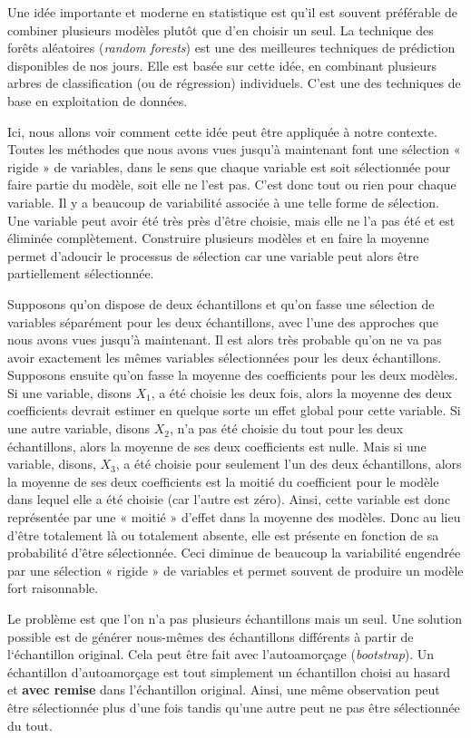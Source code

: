 \documentclass[
  11pt,
  letterpaper,
]{book}
\theoremstyle{definition}
\theoremstyle{definition}
\theoremstyle{definition}
\theoremstyle{remark}
\begin{document}
Une idée importante et moderne en statistique est qu'il est souvent préférable de combiner plusieurs modèles plutôt que d'en choisir un seul. La technique des forêts aléatoires (\emph{random forests}) est une des meilleures techniques de prédiction disponibles de nos jours. Elle est basée sur cette idée, en combinant plusieurs arbres de classification (ou de régression) individuels. C'est une des techniques de base en exploitation de données.

Ici, nous allons voir comment cette idée peut être appliquée à notre contexte. Toutes les méthodes que nous avons vues jusqu'à maintenant font une sélection « rigide » de variables, dans le sens que chaque variable est soit sélectionnée pour faire partie du modèle, soit elle ne l'est pas. C'est donc tout ou rien pour chaque variable. Il y a beaucoup de variabilité associée à une telle forme de sélection. Une variable peut avoir été très près d'être choisie, mais elle ne l'a pas été et est éliminée complètement. Construire plusieurs modèles et en faire la moyenne permet d'adoucir le processus de sélection car une variable peut alors être partiellement sélectionnée.

Supposons qu'on dispose de deux échantillons et qu'on fasse une sélection de variables séparément pour les deux échantillons, avec l'une des approches que nous avons vues jusqu'à maintenant. Il est alors très probable qu'on ne va pas avoir exactement les mêmes variables sélectionnées pour les deux échantillons. Supposons ensuite qu'on fasse la moyenne des coefficients pour les deux modèles. Si une variable, disons \(X_1\), a été choisie les deux fois, alors la moyenne des deux coefficients devrait estimer en quelque sorte un effet global pour cette variable. Si une autre variable, disons \(X_2\), n'a pas été choisie du tout pour les deux échantillons, alors la moyenne de ses deux coefficients est nulle. Mais si une variable, disons, \(X_3\), a été choisie pour seulement l'un des deux échantillons, alors la moyenne de ses deux coefficients est la moitié du coefficient pour le modèle dans lequel elle a été choisie (car l'autre est zéro). Ainsi, cette variable est donc représentée par une « moitié » d'effet dans la moyenne des modèles. Donc au lieu d'être totalement là ou totalement absente, elle est présente en fonction de sa probabilité d'être sélectionnée. Ceci diminue de beaucoup la variabilité engendrée par une sélection « rigide » de variables et permet souvent de produire un modèle fort raisonnable.

Le problème est que l'on n'a pas plusieurs échantillons mais un seul. Une solution possible est de générer nous-mêmes des échantillons différents à partir de l`échantillon original. Cela peut être fait avec l'autoamorçage (\emph{bootstrap}). Un échantillon d'autoamorçage est tout simplement un échantillon choisi au hasard et \textbf{avec remise} dans l'échantillon original. Ainsi, une même observation peut être sélectionnée plus d'une fois tandis qu'une autre peut ne pas être sélectionnée du tout.
\end{document}
